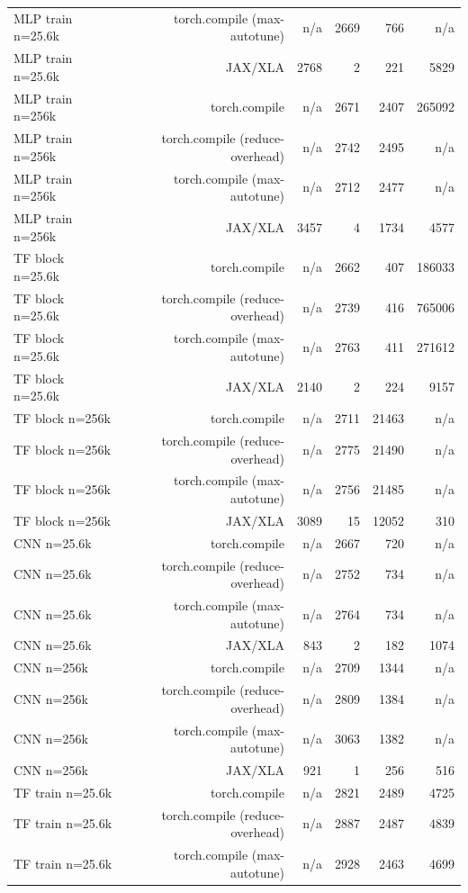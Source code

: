 \begin{tabular}{lrrrrr}
MLP train n=25.6k & torch.compile (max-autotune) & n/a & 2669 & 766 & n/a \\
MLP train n=25.6k & JAX/XLA & 2768 & 2 & 221 & 5829 \\
MLP train n=256k & torch.compile & n/a & 2671 & 2407 & 265092 \\
MLP train n=256k & torch.compile (reduce-overhead) & n/a & 2742 & 2495 & n/a \\
MLP train n=256k & torch.compile (max-autotune) & n/a & 2712 & 2477 & n/a \\
MLP train n=256k & JAX/XLA & 3457 & 4 & 1734 & 4577 \\
TF block n=25.6k & torch.compile & n/a & 2662 & 407 & 186033 \\
TF block n=25.6k & torch.compile (reduce-overhead) & n/a & 2739 & 416 & 765006 \\
TF block n=25.6k & torch.compile (max-autotune) & n/a & 2763 & 411 & 271612 \\
TF block n=25.6k & JAX/XLA & 2140 & 2 & 224 & 9157 \\
TF block n=256k & torch.compile & n/a & 2711 & 21463 & n/a \\
TF block n=256k & torch.compile (reduce-overhead) & n/a & 2775 & 21490 & n/a \\
TF block n=256k & torch.compile (max-autotune) & n/a & 2756 & 21485 & n/a \\
TF block n=256k & JAX/XLA & 3089 & 15 & 12052 & 310 \\
CNN n=25.6k & torch.compile & n/a & 2667 & 720 & n/a \\
CNN n=25.6k & torch.compile (reduce-overhead) & n/a & 2752 & 734 & n/a \\
CNN n=25.6k & torch.compile (max-autotune) & n/a & 2764 & 734 & n/a \\
CNN n=25.6k & JAX/XLA & 843 & 2 & 182 & 1074 \\
CNN n=256k & torch.compile & n/a & 2709 & 1344 & n/a \\
CNN n=256k & torch.compile (reduce-overhead) & n/a & 2809 & 1384 & n/a \\
CNN n=256k & torch.compile (max-autotune) & n/a & 3063 & 1382 & n/a \\
CNN n=256k & JAX/XLA & 921 & 1 & 256 & 516 \\
TF train n=25.6k & torch.compile & n/a & 2821 & 2489 & 4725 \\
TF train n=25.6k & torch.compile (reduce-overhead) & n/a & 2887 & 2487 & 4839 \\
TF train n=25.6k & torch.compile (max-autotune) & n/a & 2928 & 2463 & 4699 \\

\end{tabular}
